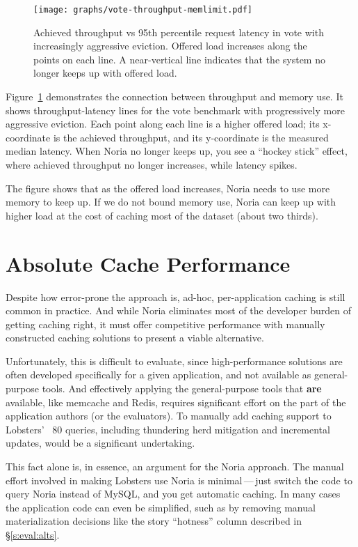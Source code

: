 \begin{figure}[h]
  \centering
  \texttt{[image: graphs/vote-throughput-memlimit.pdf]}
  \caption{Achieved throughput vs 95th percentile request latency in vote with
  increasingly aggressive eviction. Offered load increases along the points on
  each line. A near-vertical line indicates that the system no longer keeps up
  with offered load.}
  \label{f:vote-throughput-memlimit}
\end{figure}

Figure~\ref{f:vote-throughput-memlimit} demonstrates the connection between
throughput and memory use. It shows throughput-latency lines for the vote
benchmark with progressively more aggressive eviction. Each point along each
line is a higher offered load; its x-coordinate is the achieved throughput, and
its y-coordinate is the measured median latency. When Noria no longer keeps up,
you see a ``hockey stick'' effect, where achieved throughput no longer
increases, while latency spikes.

The figure shows that as the offered load increases, Noria needs to use more
memory to keep up. If we do not bound memory use, Noria can keep up with higher
load at the cost of caching most of the dataset (about two thirds).

\section{Absolute Cache Performance}
\label{s:eval:kvperf}

Despite how error-prone the approach is, ad-hoc, per-application caching is
still common in practice. And while Noria eliminates most of the developer
burden of getting caching right, it must offer competitive performance with
manually constructed caching solutions to present a viable alternative.

Unfortunately, this is difficult to evaluate, since high-performance solutions
are often developed specifically for a given application, and not available as
general-purpose tools. And effectively applying the general-purpose tools that
\textbf{are} available, like memcache and Redis, requires significant effort on
the part of the application authors (or the evaluators). To manually add caching
support to Lobsters' ~80 queries, including thundering herd mitigation and
incremental updates, would be a significant undertaking.

This fact alone is, in essence, an argument for the Noria approach. The manual
effort involved in making Lobsters use Noria is minimal\,---\,just switch the
code to query Noria instead of MySQL, and you get automatic caching. In many
cases the application code can even be simplified, such as by removing manual
materialization decisions like the story ``hotness'' column described in
\S\ref{s:eval:alts}.

